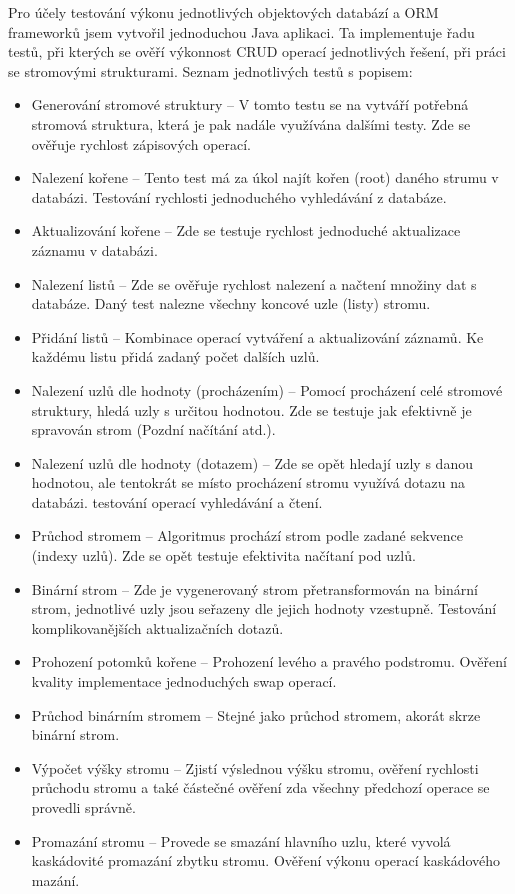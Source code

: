 Pro účely testování výkonu jednotlivých objektových databází a ORM frameworků jsem vytvořil jednoduchou Java aplikaci. Ta implementuje řadu testů, při kterých se ověří výkonnost CRUD operací jednotlivých řešení, při práci se stromovými strukturami. Seznam jednotlivých testů s popisem:
\begin{itemize}
  \item Generování stromové struktury -- V tomto testu se na vytváří potřebná stromová struktura, která je pak nadále využívána dalšími testy. Zde se ověřuje rychlost zápisových operací.
  \item Nalezení kořene -- Tento test má za úkol najít kořen (root) daného strumu v databázi. Testování rychlosti jednoduchého vyhledávání z databáze.
  \item Aktualizování kořene -- Zde se testuje rychlost jednoduché aktualizace záznamu v databázi.
  \item Nalezení listů -- Zde se ověřuje rychlost nalezení a načtení množiny dat s databáze. Daný test nalezne všechny koncové uzle (listy) stromu.
  \item Přidání listů -- Kombinace operací vytváření a aktualizování záznamů. Ke každému listu přidá zadaný počet dalších uzlů.
  \item Nalezení uzlů dle hodnoty (procházením) -- Pomocí procházení celé stromové struktury, hledá uzly s určitou hodnotou. Zde se testuje jak efektivně je spravován strom (Pozdní načítání atd.).
  \item Nalezení uzlů dle hodnoty (dotazem) -- Zde se opět hledají uzly s danou hodnotou, ale tentokrát se místo procházení stromu využívá dotazu na databázi. testování operací vyhledávání a čtení.
  \item Průchod stromem -- Algoritmus prochází strom podle zadané sekvence (indexy uzlů). Zde se opět testuje efektivita načítaní pod uzlů.
  \item Binární strom -- Zde je vygenerovaný strom přetransformován na binární strom, jednotlivé uzly jsou seřazeny dle jejich hodnoty vzestupně. Testování komplikovanějších aktualizačních dotazů.
  \item Prohození potomků kořene -- Prohození levého a pravého podstromu. Ověření kvality implementace jednoduchých swap operací.
  \item Průchod binárním stromem -- Stejné jako průchod stromem, akorát skrze binární strom.
  \item Výpočet výšky stromu -- Zjistí výslednou výšku stromu, ověření rychlosti průchodu stromu a také částečné ověření zda všechny předchozí operace se provedli správně.
  \item Promazání stromu -- Provede se smazání hlavního uzlu, které vyvolá kaskádovité promazání zbytku stromu. Ověření výkonu operací kaskádového mazání.
\end{itemize}

